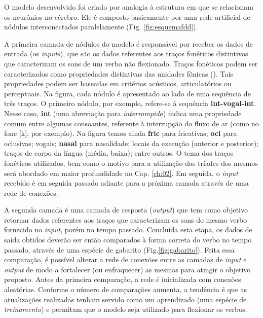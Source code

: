 


O modelo desenvolvido foi criado por analogia à estrutura em que se relacionam os neurônios no cérebro. Ele é composto basicamente por uma rede artificial de nódulos interconectados paralelamente (Fig. \ref{fig:esquemafdd}).

A primeira camada de nódulos do modelo é responsável por receber os dados de entrada (os \textit{inputs}), que são os dados referentes aos traços fonéticos distintivos que caracterizam os sons de um verbo não flexionado. Traços fonéticos podem ser caracterizados como propriedades distintivas das unidades fônicas (\cite{paraconhecer:2015}). Tais propriedades podem ser baseadas em critérios acústicos, articulatórios ou perceptuais. Na figura, cada nódulo é apresentado ao lado de uma sequência de três traços. O primeiro nódulo, por exemplo, refere-se à sequência \textbf{int-vogal-int}. Nesse caso, \textbf{int} (uma abreviação para \textit{interrompida}) indica uma propriedade comum entre algumas consoantes, referente à interrupção do fluxo de ar (como no fone [k], por exemplo). Na figura temos ainda \textbf{fric} para fricativas; \textbf{ocl} para oclusivas; vogais; \textbf{nasal} para nasalidade; locais da execução (anterior e posterior); traços de corpo da língua (média, baixa); entre outros. O tema dos traços fonéticos utilizados, bem como o motivo para a utilização das tríades dos mesmos será abordado em maior profundidade no Cap. \ref{ch:02}. Em seguida, o \textit{input} recebido é em seguida passado adiante para a próxima camada através de uma rede de conexões. 

A segunda camada é uma camada de resposta (\textit{output}) que tem como objetivo retornar dados referentes aos traços que caracterizam os sons do mesmo verbo fornecido no \textit{input}, porém no tempo passado. Concluída esta etapa, os dados de saída obtidos deverão ser então comparados à forma correta do verbo no tempo passado, através de uma espécie de gabarito (Fig.\ref{fig:gabarito}). Feita essa comparação, é possível alterar a rede de conexões entre as camadas de \textit{input} e \textit{output} de modo a fortalecer (ou enfraquecer) as mesmas para atingir o objetivo proposto. Antes da primeira comparação, a rede é inicializada com conexões aleatórias. Conforme o número de comparações aumenta, a tendência é que as atualizações realizadas tenham servido como um aprendizado (uma espécie de \textit{treinamento}) e permitam que o modelo seja utilizado para flexionar os verbos.



